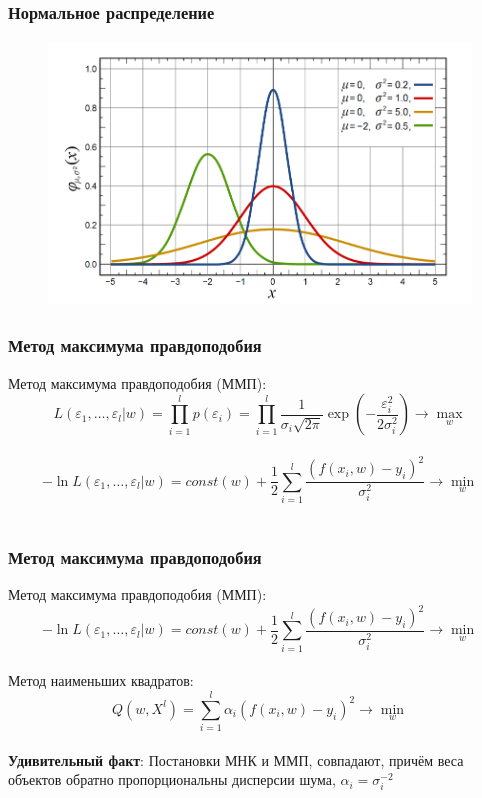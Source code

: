 \documentclass[12pt]{beamer}
\begin{document}
\begin{frame}\frametitle{Нормальное распределение}
\begin{figure}[htbp]
  \includegraphics[height=200pt, keepaspectratio = true]{images/gauss}   
\end{figure}
\end{frame}


\begin{frame}\frametitle{Метод максимума правдоподобия}
Метод максимума правдоподобия (ММП):\\
$$L(\varepsilon_1, \dots, \varepsilon_l | w) = \prod\limits_{i=1}^l p(\varepsilon_i) = \prod\limits_{i=1}^l \frac{1}{\sigma_i \sqrt{2\pi}} \exp (-\frac{\varepsilon_i^2}{2\sigma_i^2}  ) \rightarrow \max\limits_{w}$$\\
$$- \ln L(\varepsilon_1, \dots, \varepsilon_l| w) = const(w) + \frac{1}{2} \sum\limits_{i=1}^l \frac{(f(x_i, w) - y_i)^2}{\sigma_i^2}  \rightarrow \min\limits_{w}$$\\
\end{frame}

\begin{frame}\frametitle{Метод максимума правдоподобия}
Метод максимума правдоподобия (ММП):\\
$$- \ln L(\varepsilon_1, \dots, \varepsilon_l| w) = const(w) + \frac{1}{2} \sum\limits_{i=1}^l \frac{(f(x_i, w) - y_i)^2}{\sigma_i^2}  \rightarrow \min\limits_{w}$$\\
\vspace{2mm}
Метод наименьших квадратов: $$Q(w,X^l) = \sum\limits_{i=1}^l \alpha_i (f (x_i, w) - y_i)^2 \rightarrow \min\limits_{w}$$\\
\vspace{5mm}
\textbf{Удивительный факт}: Постановки МНК и ММП, совпадают, причём веса объектов
обратно пропорциональны дисперсии шума, $\alpha_i = \sigma_i^{-2}$
\end{frame}
\end{document}
